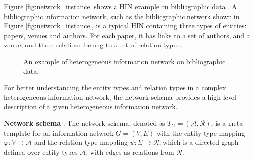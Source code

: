 \documentclass{acm_proc_article-csis8101}
\begin{document}
\begin{example}
Figure \ref{fig:network_instance} shows a HIN example on bibliographic data \cite{sun2013mining}. A bibliographic information network, such as the bibliographic network shown in Figure \ref{fig:network_instance}, is a typical HIN containing three types of entities: papers, venues and authors. For each paper, it has links to a set of authors, and a venue, and these relations belong to a set of relation types.
\end{example}

\begin{figure}[!t]
\centering
{}
\hfil
{}
\caption{An example of heterogeneous information network on bibliographic data.}
\label{fig:network}
\end{figure}

For better understanding the entity types and relation types in a complex heterogeneous information network, the network schema provides a high-level description of a given heterogeneous information network.

\begin{definition}
{\bf Network schema} \cite{sun2013mining,sun2009ranking}. The network schema, denoted as $T_{G}=(\mathcal{A},\mathcal{R})$, is a meta template for an information network $G=(V,E)$ with the entity type mapping $\varphi: V \rightarrow \mathcal{A}$ and the relation type mappling $\psi: E \rightarrow \mathcal{R}$, which is a directed graph defined over entity types $\mathcal{A}$, with edges as relations from $\mathcal{R}$.
\end{definition}
\end{document}
